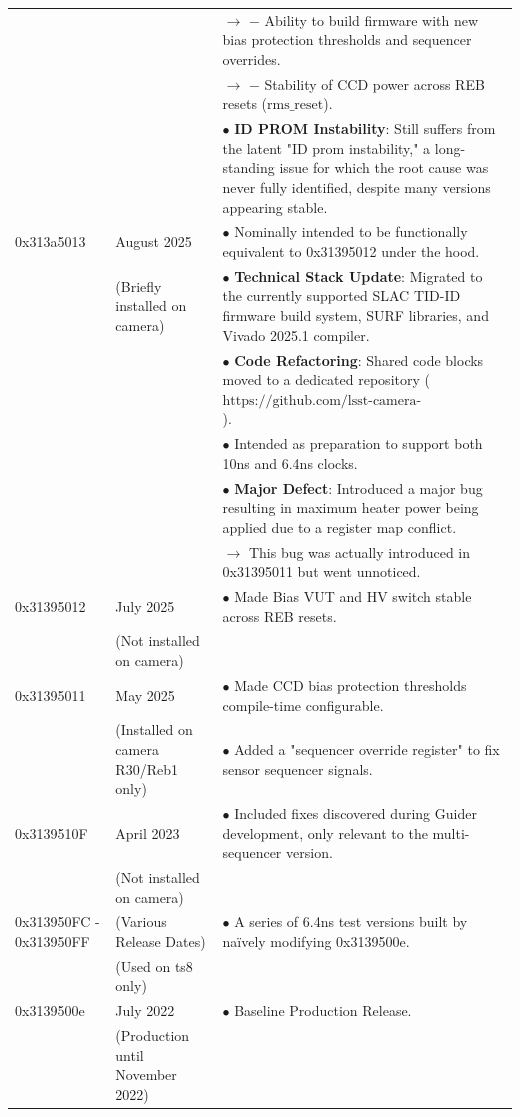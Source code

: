 \begin{longtable}{>{\RaggedRight\arraybackslash}p{} >{\RaggedRight\arraybackslash}p{} >{\RaggedRight\arraybackslash}p{}}
 & & \quad $\rightarrow$ \quad $-$ Ability to build firmware with new bias protection thresholds and sequencer overrides. \\
 & & \quad $\rightarrow$ \quad $-$ Stability of CCD power across REB resets ($\text{rms\_reset}$). \\
 & & $\bullet$ \textbf{ID PROM Instability}: Still suffers from the latent "ID prom instability," a long-standing issue for which the root cause was never fully identified, despite many versions appearing stable. \\
\midrule
0x313a5013 & August 2025 & $\bullet$ Nominally intended to be functionally equivalent to 0x31395012 under the hood. \\
 & (Briefly installed on camera) & $\bullet$ \textbf{Technical Stack Update}: Migrated to the currently supported SLAC TID-ID firmware build system, SURF libraries, and Vivado 2025.1 compiler. \\
 & & $\bullet$ \textbf{Code Refactoring}: Shared code blocks moved to a dedicated repository ($\text{https://github.com/lsst-camera-electronics/lsst\_reb}$). \\
 & & $\bullet$ Intended as preparation to support both 10ns and 6.4ns clocks. \\
 & & $\bullet$ \textbf{Major Defect}: Introduced a major bug resulting in maximum heater power being applied due to a register map conflict. \\
 & & \quad $\rightarrow$ This bug was actually introduced in 0x31395011 but went unnoticed. \\
\midrule
0x31395012 & July 2025 & $\bullet$ Made Bias VUT and HV switch stable across REB resets. \\
 & (Not installed on camera) & \\
\midrule
0x31395011 & May 2025 & $\bullet$ Made CCD bias protection thresholds compile-time configurable. \\
 & (Installed on camera R30/Reb1 only) & $\bullet$ Added a "sequencer override register" to fix sensor sequencer signals. \\
\midrule
0x3139510F & April 2023 & $\bullet$ Included fixes discovered during Guider development, only relevant to the multi-sequencer version. \\
 & (Not installed on camera) & \\
\midrule
0x313950FC - 0x313950FF & (Various Release Dates) & $\bullet$ A series of 6.4ns test versions built by naïvely modifying 0x3139500e. \\
 & (Used on ts8 only) & \\
\midrule
0x3139500e & July 2022 & $\bullet$ Baseline Production Release. \\
 & (Production until November 2022) & \\
\end{longtable}

